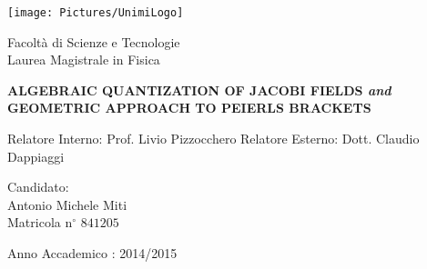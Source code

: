 \documentclass[
    pdftex,
    fontsize=11pt,
    a4paper
   ]{scrbook}
\begin{document}
\begin{titlepage}
{
\thispagestyle{empty}

\centerline{
\texttt{[image: Pictures/UnimiLogo]}
}

\begin{center}
{\Large Facoltà di Scienze e Tecnologie\\
\vskip0.2cm Laurea Magistrale in Fisica }
\end{center}


\vskip1.5cm
\begin{center}\begin{doublespace}
{\huge \textbf{
		 ALGEBRAIC QUANTIZATION OF JACOBI FIELDS 
		 \emph{and}
		 GEOMETRIC APPROACH TO PEIERLS BRACKETS}
}
\end{doublespace}\end{center}

{\large
\vskip20mm Relatore Interno:  Prof. Livio Pizzocchero 
\vskip1mm Relatore Esterno:  Dott. Claudio Dappiaggi
}

\vskip2cm
\hskip9cm\parbox[t]{7cm}
{\large 
	Candidato:\\
	\quad Antonio Michele Miti\\
	\quad Matricola n$^\circ$ $841205$\\
}
	\vfill
	\begin{center}
		Anno Accademico : 2014/2015
	\end{center}

\newpage
\newpage
\thispagestyle{empty}
\clearpage
}

\end{titlepage}
\end{document}
